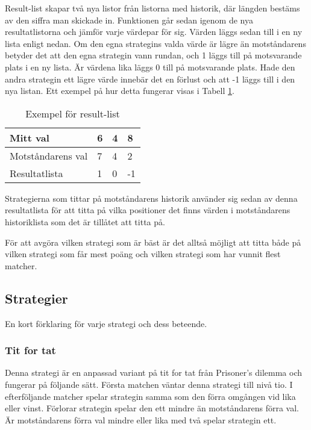 Result-list skapar två nya listor från listorna med historik, där längden bestäms av den siffra man skickade in. Funktionen går sedan igenom de nya resultatlistorna och jämför varje värdepar för sig. Värden läggs sedan till i en ny lista enligt nedan. Om den egna strategins valda värde är lägre än motståndarens betyder det att den egna strategin vann rundan, och 1 läggs till på motsvarande plats i en ny lista. Är värdena lika läggs 0 till på motsvarande plats. Hade den andra strategin ett lägre värde innebär det en förlust och att -1 läggs till i den nya listan. Ett exempel på hur detta fungerar visas i Tabell \ref{table:result-list}.

\begin{table}[htb]
	\begin{center}
		\begin{tabular}{| l | l | l | l |}
			\hline
			Mitt val & 6 & 4 & 8 \\ \hline
			Motståndarens val & 7 & 4 & 2 \\ \hline
			Resultatlista & 1 & 0 & -1 \\ \hline
		\end{tabular}
	\end{center}
	\caption{Exempel för result-list}
	\label{table:result-list}
\end{table}

Strategierna som tittar på motståndarens historik använder sig sedan av denna resultatlista för att titta på vilka positioner det finns värden i motståndarens historiklista som det är tillåtet att titta på.

För att avgöra vilken strategi som är bäst är det alltså möjligt att titta både på vilken strategi som får mest poäng och vilken strategi som har vunnit flest matcher.

\subsection{Strategier}
En kort förklaring för varje strategi och dess beteende.

\subsubsection{Tit for tat}
Denna strategi är en anpassad variant på tit for tat från Prisoner’s dilemma och fungerar på följande sätt. Första matchen väntar denna strategi till nivå tio. I efterföljande matcher spelar strategin samma som den förra omgången vid lika eller vinst. Förlorar strategin spelar den ett mindre än motståndarens förra val. Är motståndarens förra val mindre eller lika med två spelar strategin ett.

